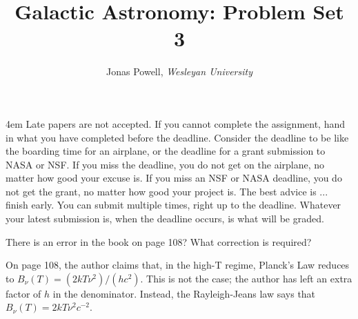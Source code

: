 \documentclass[12pt]{article}
\newenvironment{problem}[2][Problem]{\begin{trivlist}
\item[\hskip \labelsep {\bfseries #1}\hskip \labelsep {\bfseries #2.}]}{\end{trivlist}}
\newenvironment{answer}[2][Answer]{\begin{trivlist}
\item[\hskip \labelsep {\bfseries #1}\hskip \labelsep {\bfseries #2.}]}{\end{trivlist}}
\begin{document}



\title{\Large \textbf{Galactic Astronomy: Problem Set 3}}

\author{{\rm Jonas Powell, \textit{Wesleyan University}}}


\maketitle


\begin{addmargin}[4em]{4em}
 Late papers are not accepted. If you cannot complete the assignment, hand in what you have completed before the deadline. Consider the deadline to be like the boarding time for an airplane, or the deadline for a grant submission to NASA or NSF. If you miss the deadline, you do not get on the airplane, no matter how good your excuse is. If you miss an NSF or NASA deadline, you do not get the grant, no matter how good your project is. The best advice is ... finish early. You can submit multiple times, right up to the deadline. Whatever your latest submission is, when the deadline occurs, is what will be graded.
\bigskip \bigskip
\end{addmargin}




\begin{problem}{1}
  There is an error in the book on page 108? What correction is required?
\end{problem}

\begin{answer}{1}
  On page 108, the author claims that, in the high-T regime, Planck's Law reduces to $B_\nu(T) = (2kT \nu^2)/(h c^2)$. This is not the case; the author has left an extra factor of $h$ in the denominator. Instead, the Rayleigh-Jeans law says that $B_\nu(T) = 2kT \nu^2 c^{-2}$.
\end{answer}
\end{document}

